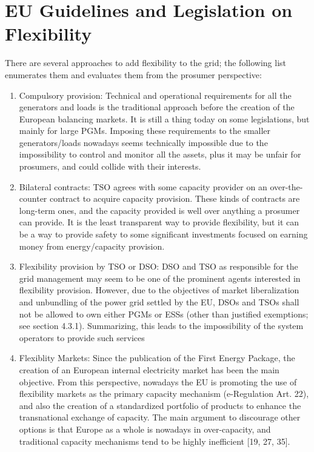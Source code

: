 \section{EU Guidelines and Legislation on Flexibility}
There are several approaches to add flexibility to the grid; the following list enumerates them and evaluates them from the prosumer perspective: 
\begin{enumerate}
\item Compulsory provision: Technical and operational requirements for all the generators and
loads is the traditional approach before the creation of the European balancing markets.
It is still a thing today on some legislations, but mainly for large PGMs. Imposing these requirements
to the smaller generators/loads nowadays seems technically impossible due to
the impossibility to control and monitor all the assets, plus it may be unfair for prosumers,
and could collide with their interests.
\item Bilateral contracts: TSO agrees with some capacity provider on an over-the-counter contract
to acquire capacity provision. These kinds of contracts are long-term ones, and the
capacity provided is well over anything a prosumer can provide. It is the least transparent
way to provide flexibility, but it can be a way to provide safety to some significant
investments focused on earning money from energy/capacity provision.
\item Flexibility provision by TSO or DSO: DSO and TSO as responsible for the grid management
may seem to be one of the prominent agents interested in flexibility provision.
However, due to the objectives of market liberalization and unbundling of the power grid
settled by the EU, DSOs and TSOs shall not be allowed to own either PGMs or ESSs (other
than justified exemptions; see section 4.3.1). Summarizing, this leads to the impossibility
of the system operators to provide such services
\item Flexiblity Markets: Since the publication of the First Energy Package, the creation of an
European internal electricity market has been the main objective. From this perspective,
nowadays the EU is promoting the use of flexibility markets as the primary capacity mechanism
(e-Regulation Art. 22), and also the creation of a standardized portfolio of products
to enhance the transnational exchange of capacity. The main argument to discourage other
options is that Europe as a whole is nowadays in over-capacity, and traditional capacity
mechanisms tend to be highly inefficient [19, 27, 35].
\end{enumerate}

